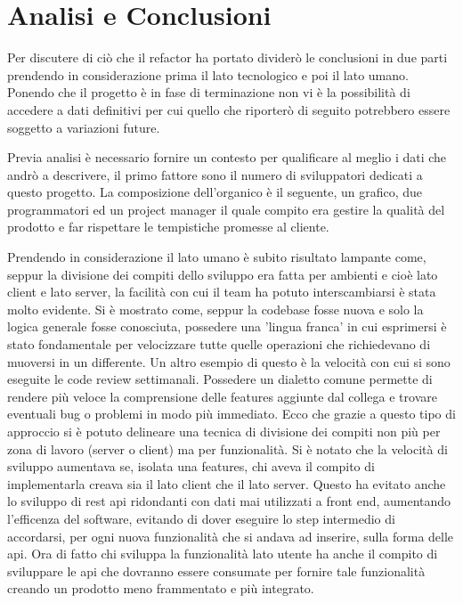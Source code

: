 \chapter{Analisi e Conclusioni}
\label{cha:intro}
\vspace{5mm}

Per discutere di ciò che il refactor ha portato dividerò le conclusioni in due parti prendendo in considerazione prima il lato tecnologico e poi il lato umano. Ponendo che il progetto è in fase di terminazione non vi è la possibilità di accedere a dati definitivi per cui quello che riporterò di seguito potrebbero essere soggetto a variazioni future.

\vspace{5mm} Previa analisi è necessario fornire un contesto per qualificare al meglio i dati che andrò a descrivere, il primo fattore sono il numero di sviluppatori dedicati a questo progetto. La composizione dell'organico è il seguente, un grafico, due programmatori ed un project manager il quale compito era gestire la qualità del prodotto e far rispettare le tempistiche promesse al cliente.

\vspace{5mm}Prendendo in considerazione il lato umano è subito risultato lampante come, seppur la divisione dei compiti dello sviluppo era fatta per ambienti e cioè lato client e lato server, la facilità con cui il team ha potuto interscambiarsi è stata molto evidente. Si è mostrato come, seppur la codebase fosse nuova e solo la logica generale fosse conosciuta, possedere una 'lingua franca' in cui esprimersi è stato fondamentale per velocizzare tutte quelle operazioni che richiedevano di muoversi in un differente. Un altro esempio di questo è la velocità con cui si sono eseguite le code review settimanali. Possedere un dialetto comune permette di rendere più veloce la comprensione delle features aggiunte dal collega e trovare eventuali bug o problemi in modo più immediato. Ecco che grazie a questo tipo di approccio si è potuto delineare una tecnica di divisione dei compiti non più per zona di lavoro (server o client) ma per funzionalità. Si è notato che la velocità di sviluppo aumentava se, isolata una features, chi aveva il compito di implementarla creava sia il lato client che il lato server. Questo ha evitato anche lo sviluppo di rest api ridondanti con dati mai utilizzati a front end, aumentando l'efficenza del software, evitando di dover eseguire lo step intermedio di accordarsi, per ogni nuova funzionalità che si andava ad inserire, sulla forma delle api. Ora di fatto chi sviluppa la funzionalità lato utente ha anche il compito di sviluppare le api che dovranno essere consumate per fornire tale funzionalità creando un prodotto meno frammentato e più integrato. 

